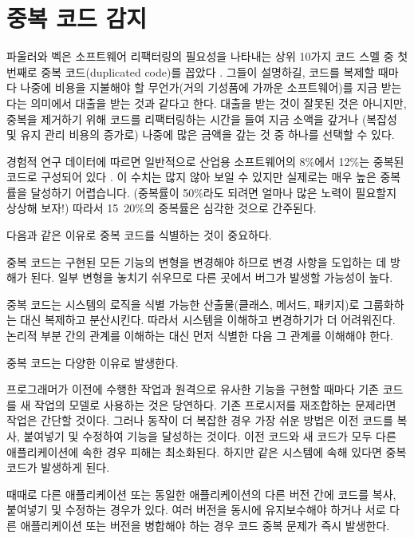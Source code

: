 \documentclass[a4paper,10pt,twoside]{book}
\begin{document}
	\renewcommand{\nnbb}[2]{} %
	\sloppy
\fi
\chapter{중복 코드 감지}

파울러와 벡은 소프트웨어 리팩터링의 필요성을 나타내는 상위 10가지 코드 스멜 중 첫 번째로 중복 코드(duplicated code)를 꼽았다 \cite{Fowl99a}. 그들이 설명하길, 코드를 복제할 때마다 나중에 비용을 지불해야 할 무언가(거의 기성품에 가까운 소프트웨어)를 지금 받는다는 의미에서 대출을 받는 것과 같다고 한다. 대출을 받는 것이 잘못된 것은 아니지만, 중복을 제거하기 위해 코드를 리팩터링하는 시간을 들여 지금 소액을 갚거나 (복잡성 및 유지 관리 비용의 증가로) 나중에 많은 금액을 갚는 것 중 하나를 선택할 수 있다.

경험적 연구 데이터에 따르면 일반적으로 산업용 소프트웨어의 8\%에서 12\%는 중복된 코드로 구성되어 있다 \cite{Duca99b}. 이 수치는 많지 않아 보일 수 있지만 실제로는 매우 높은 중복률을 달성하기 어렵습니다. (중복률이 50\%라도 되려면 얼마나 많은 노력이 필요할지 상상해 보자!) 따라서 15~20\%의 중복률은 심각한 것으로 간주된다. 

다음과 같은 이유로 중복 코드를 식별하는 것이 중요하다.

\begin{bulletlist}
\item 중복 코드는 구현된 모든 기능의 변형을 변경해야 하므로 변경 사항을 도입하는 데 방해가 된다. 일부 변형을 놓치기 쉬우므로 다른 곳에서 버그가 발생할 가능성이 높다.

\item 중복 코드는 시스템의 로직을 식별 가능한 산출물(클래스, 메서드, 패키지)로 그룹화하는 대신 복제하고 분산시킨다. 따라서 시스템을 이해하고 변경하기가 더 어려워진다. 논리적 부분 간의 관계를 이해하는 대신 먼저 식별한 다음 그 관계를 이해해야 한다.
\end{bulletlist}

중복 코드는 다양한 이유로 발생한다.

\begin{bulletlist}
\item 프로그래머가 이전에 수행한 작업과 원격으로 유사한 기능을 구현할 때마다 기존 코드를 새 작업의 모델로 사용하는 것은 당연하다. 기존 프로시저를 재조합하는 문제라면 작업은 간단할 것이다. 그러나 동작이 더 복잡한 경우 가장 쉬운 방법은 이전 코드를 복사, 붙여넣기 및 수정하여 기능을 달성하는 것이다. 이전 코드와 새 코드가 모두 다른 애플리케이션에 속한 경우 피해는 최소화된다. 하지만 같은 시스템에 속해 있다면 중복 코드가 발생하게 된다.

\item 때때로 다른 애플리케이션 또는 동일한 애플리케이션의 다른 버전 간에 코드를 복사, 붙여넣기 및 수정하는 경우가 있다. 여러 버전을 동시에 유지보수해야 하거나 서로 다른 애플리케이션 또는 버전을 병합해야 하는 경우 코드 중복 문제가 즉시 발생한다.
\end{bulletlist}
\end{document}

